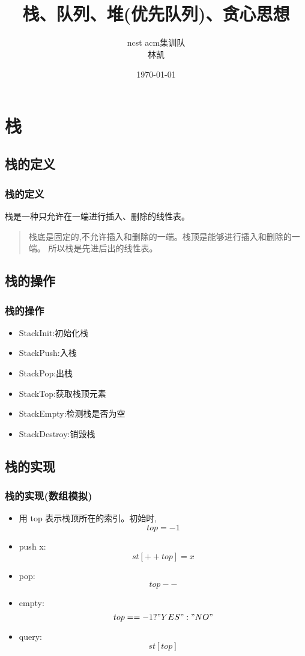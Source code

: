 \documentclass{beamer}
\title{栈、队列、堆(优先队列)、贪心思想}
\author{ncst acm集训队\\ 林凯}
\date{\today}
\begin{document}
\frame{\titlepage}

\section{栈}
\frame{\sectionpage}
\subsection{栈的定义}
\begin{frame}
\frametitle{栈的定义}
栈是一种只允许在一端进行插入、删除的线性表。

\begin{quote}
栈底是固定的,不允许插入和删除的一端。栈顶是能够进行插入和删除的一端。
所以栈是先进后出的线性表。
\end{quote}


\end{frame}

\subsection{栈的操作}
\begin{frame}
\frametitle{栈的操作}

\begin{itemize}
    \item StackInit:初始化栈
    \item StackPush:入栈
    \item StackPop:出栈
    \item StackTop:获取栈顶元素
    \item StackEmpty:检测栈是否为空
    \item StackDestroy:销毁栈
\end{itemize}
\end{frame}
\subsection{栈的实现}
\begin{frame}
\frametitle{栈的实现(数组模拟)}
\begin{itemize}
    \item 用 top 表示栈顶所在的索引。初始时,$$top = -1$$
    \item push x:$$st[++top] = x$$
    \item pop:$$top--$$
    \item empty:$$top == -1 ? "YES" : "NO"$$
    \item query:$$st[top]$$
\end{itemize}
\end{frame}
\end{document}
